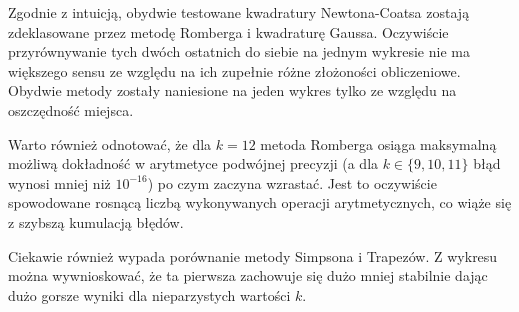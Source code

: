 \documentclass[11pt,leqno]{article}
\begin{document}
Zgodnie z intuicją, obydwie testowane kwadratury Newtona-Coatsa zostają zdeklasowane przez metodę Romberga i kwadraturę Gaussa. Oczywiście przyrównywanie tych dwóch ostatnich do siebie na jednym wykresie nie ma większego sensu ze względu na ich zupełnie różne złożoności obliczeniowe. Obydwie metody zostały naniesione na jeden wykres tylko ze względu na oszczędność miejsca.
 
Warto również odnotować, że dla $k = 12$ metoda Romberga osiąga maksymalną możliwą dokładność w arytmetyce podwójnej precyzji (a dla $k \in \{9, 10, 11\}$ błąd wynosi mniej niż $10^{-16}$) po czym zaczyna wzrastać. Jest to oczywiście spowodowane rosnącą liczbą wykonywanych operacji arytmetycznych, co wiąże się z szybszą kumulacją błędów.

Ciekawie również wypada porównanie metody Simpsona i Trapezów. Z wykresu można wywnioskować, że ta pierwsza zachowuje się dużo mniej stabilnie dając dużo gorsze wyniki dla nieparzystych wartości $k$.
\end{document}

